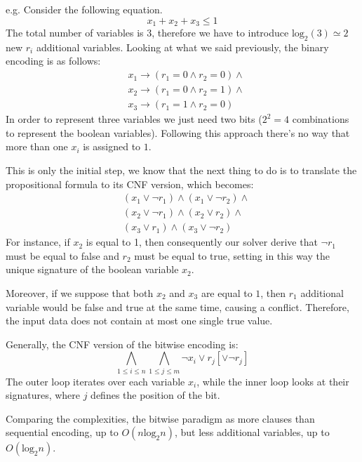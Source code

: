 \begin{example}
    e.g. Consider the following equation.
    $$x_1 + x_2 + x_3 \leq 1$$
    The total number of variables is $3$, therefore we have to introduce $\text{log}_2(3) \simeq 2$ new $r_i$ additional variables. Looking at what we said 
    previously, the binary encoding is as follows:
    $$
        \begin{aligned}
            & x_1 \rightarrow (r_1 = 0 \wedge r_2 = 0) \wedge \\ 
            & x_2 \rightarrow (r_1 = 0 \wedge r_2 = 1) \wedge \\
            & x_3 \rightarrow (r_1 = 1 \wedge r_2 = 0)
        \end{aligned}
    $$
    In order to represent three variables we just need two bits ($2^2 = 4$ combinations to represent the boolean variables). Following this approach there's no 
    way that more than one $x_i$ is assigned to $1$. \vspace{7pt}

    This is only the initial step, we know that the next thing to do is to translate the propositional formula to its CNF version, which becomes:
    $$
        \begin{aligned}
            & (x_1 \vee \neg r_1) \wedge (x_1  \vee \neg r_2) \wedge\\ 
            & (x_2 \vee \neg r_1) \wedge (x_2  \vee r_2)\wedge \\
            & (x_3 \vee r_1) \wedge (x_3  \vee \neg r_2)
        \end{aligned}
    $$
    For instance, if $x_2$ is equal to 1, then consequently our solver derive that $\neg r_1$ must be equal to false and $r_2$ must be equal to true, setting 
    in this way the unique signature of the boolean variable $x_2$. \vspace{7pt}

    Moreover, if we suppose that both $x_2$ and $x_3$ are equal to $1$, then $r_1$ additional variable would be false and true at the same time, causing a conflict. Therefore, the input data does not contain at most one single true value.
\end{example}
Generally, the CNF version of the bitwise encoding is:
$$\bigwedge_{1 \leq i \leq n} \bigwedge_{1 \leq j \leq m} \neg x_i \vee r_j [\vee \neg r_j]$$
The outer loop iterates over each variable $x_i$, while the inner loop looks at their signatures, where $j$ defines the position of the bit. \vspace{7pt}

Comparing the complexities, the bitwise paradigm as more clauses than sequential encoding, up to $O(n\text{log}_2n)$, but less additional 
variables, up to $O(\text{log}_2n)$.
